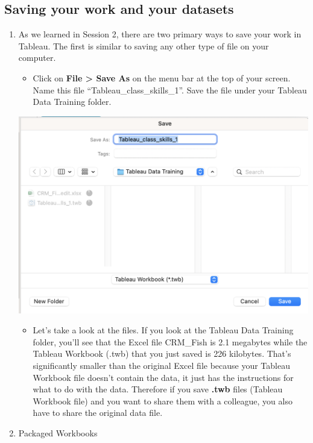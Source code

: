 \documentclass[
]{book}
\providecommand{\tightlist}{%
  \setlength{\itemsep}{0pt}\setlength{\parskip}{0pt}}
\begin{document}
\hypertarget{saving-your-work-and-your-datasets}{%
\subsection{Saving your work and your datasets}\label{saving-your-work-and-your-datasets}}

\begin{enumerate}
\def\labelenumi{\arabic{enumi}.}
\item
  As we learned in Session 2, there are two primary ways to save your work in Tableau. The first is similar to saving any other type of file on your computer.

  \begin{itemize}
  \tightlist
  \item
    Click on \textbf{File \textgreater{} Save As} on the menu bar at the top of your screen. Name this file ``Tableau\_class\_skills\_1''. Save the file under your Tableau Data Training folder.
  \end{itemize}

  \includegraphics{images/M3S2_save-as.png}

  \begin{itemize}
  \tightlist
  \item
    Let's take a look at the files. If you look at the Tableau Data Training folder, you'll see that the Excel file CRM\_Fish is 2.1 megabytes while the Tableau Workbook (.twb) that you just saved is 226 kilobytes. That's significantly smaller than the original Excel file because your Tableau Workbook file doesn't contain the data, it just has the instructions for what to do with the data. Therefore if you save \textbf{.twb} files (Tableau Workbook file) and you want to share them with a colleague, you also have to share the original data file.
  \end{itemize}
\item
  Packaged Workbooks


\end{enumerate}
\end{document}
